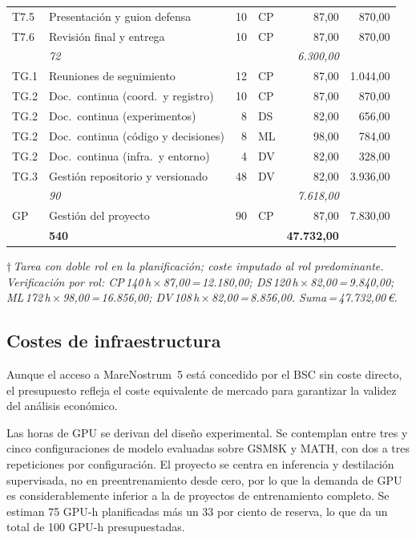 {\begin{tabularx}{\textwidth}{>{\ttfamily}l >{\raggedright\arraybackslash}X r l r r}
T7.5 & Presentación y guion defensa & 10 & CP & 87,00 & 870,00 \\
T7.6 & Revisión final y entrega & 10 & CP & 87,00 & 870,00 \\
\multicolumn{2}{r}{\textit{Subtotal F7}} & \textit{72} & & & \textit{6.300,00} \\
\addlinespace[1.5pt]
TG.1 & Reuniones de seguimiento & 12 & CP & 87,00 & 1.044,00 \\
TG.2 & Doc.\ continua (coord.\ y registro) & 10 & CP & 87,00 & 870,00 \\
TG.2 & Doc.\ continua (experimentos) & 8 & DS & 82,00 & 656,00 \\
TG.2 & Doc.\ continua (código y decisiones) & 8 & ML & 98,00 & 784,00 \\
TG.2 & Doc.\ continua (infra.\ y entorno) & 4 & DV & 82,00 & 328,00 \\
TG.3 & Gestión repositorio y versionado & 48 & DV & 82,00 & 3.936,00 \\
\multicolumn{2}{r}{\textit{Subtotal TG}} & \textit{90} & & & \textit{7.618,00} \\
\addlinespace[1.5pt]
GP & Gestión del proyecto & 90 & CP & 87,00 & 7.830,00 \\
\midrule
\multicolumn{2}{r}{\textbf{TOTAL CPA}} & \textbf{540} & & & \textbf{47.732,00} \\
\end{tabularx}
}

\noindent\textit{\scriptsize $\dagger$\,Tarea con doble rol en la planificación; coste imputado al rol predominante. Verificación por rol: CP\,140\,h\,$\times$\,87,00\,=\,12.180,00; DS\,120\,h\,$\times$\,82,00\,=\,9.840,00; ML\,172\,h\,$\times$\,98,00\,=\,16.856,00; DV\,108\,h\,$\times$\,82,00\,=\,8.856,00. Suma\,=\,47.732,00\,\euro{}.}

\subsection{Costes de infraestructura}

Aunque el acceso a MareNostrum~5 está concedido por el BSC sin coste directo, el presupuesto refleja el coste equivalente de mercado para garantizar la validez del análisis económico.

Las horas de GPU se derivan del diseño experimental. Se contemplan entre tres y cinco configuraciones de modelo evaluadas sobre GSM8K y MATH, con dos a tres repeticiones por configuración. El proyecto se centra en inferencia y destilación supervisada, no en preentrenamiento desde cero, por lo que la demanda de GPU es considerablemente inferior a la de proyectos de entrenamiento completo. Se estiman 75 GPU-h planificadas más un 33 por ciento de reserva, lo que da un total de 100 GPU-h presupuestadas.

